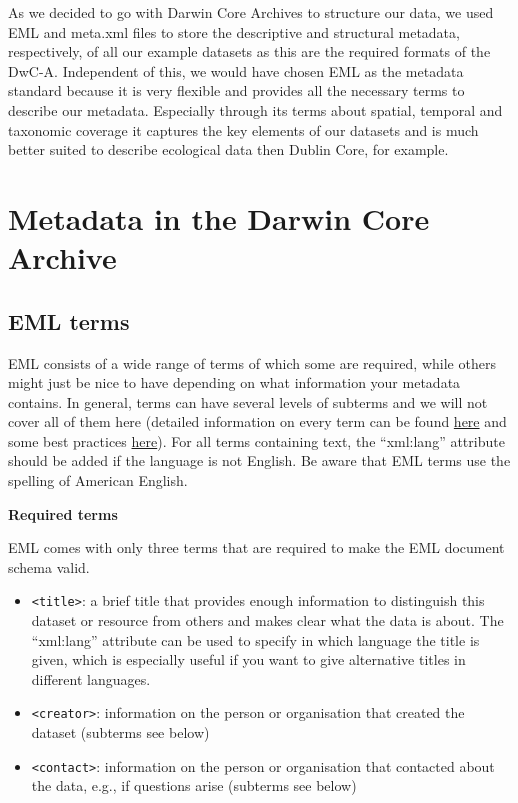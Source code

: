 \documentclass[
  oneside]{book}
\begin{document}
As we decided to go with Darwin Core Archives to structure our data, we used EML and meta.xml files to store the descriptive and structural metadata, respectively, of all our example datasets as this are the required formats of the DwC-A. Independent of this, we would have chosen EML as the metadata standard because it is very flexible and provides all the necessary terms to describe our metadata. Especially through its terms about spatial, temporal and taxonomic coverage it captures the key elements of our datasets and is much better suited to describe ecological data then Dublin Core, for example.

\section{Metadata in the Darwin Core Archive}\label{metadata-DwCA}

\subsection{EML terms}\label{eml-terms}

EML consists of a wide range of terms of which some are required, while others might just be nice to have depending on what information your metadata contains. In general, terms can have several levels of subterms and we will not cover all of them here (detailed information on every term can be found \href{https://eml.ecoinformatics.org/schema/}{here} and some best practices \href{https://ediorg.github.io/data-package-best-practices/eml-best-practices.html}{here}). For all terms containing text, the ``xml:lang'' attribute should be added if the language is not English. Be aware that EML terms use the spelling of American English.

{\textbf{Required terms}}

EML comes with only three terms that are required to make the EML document schema valid.

\begin{itemize}
\item
  {\texttt{\textless{}title\textgreater{}}}: a brief title that provides enough information to distinguish this dataset or resource from others and makes clear what the data is about. The ``xml:lang'' attribute can be used to specify in which language the title is given, which is especially useful if you want to give alternative titles in different languages.
\item
  {\texttt{\textless{}creator\textgreater{}}}: information on the person or organisation that created the dataset (subterms see below)
\item
  {\texttt{\textless{}contact\textgreater{}}}: information on the person or organisation that contacted about the data, e.g., if questions arise (subterms see below)
\end{itemize}
\end{document}
